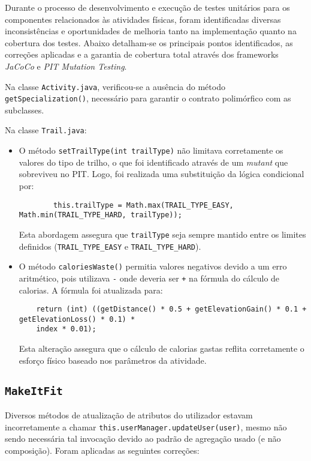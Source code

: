 \documentclass[12pt, a4paper]{article}
\begin{document}
Durante o processo de desenvolvimento e execução de testes unitários para os componentes
relacionados às atividades físicas, foram identificadas diversas inconsistências e oportunidades de
melhoria tanto na implementação quanto na cobertura dos testes. Abaixo detalham-se os principais
pontos identificados, as correções aplicadas e a garantia de cobertura total através dos frameworks
\emph{JaCoCo} e \emph{PIT Mutation Testing}.

Na classe \texttt{Activity.java}, verificou-se a ausência do método \texttt{getSpecialization()},
necessário para garantir o contrato polimórfico com as subclasses.

Na classe \texttt{Trail.java}:
\begin{itemize}
  \item O método \texttt{setTrailType(int trailType)} não limitava corretamente os valores do tipo
  de trilho, o que foi identificado através de um \emph{mutant} que sobreviveu no PIT. Logo, foi
  realizada uma substituição da lógica condicional por:
  \begin{verbatim}
        this.trailType = Math.max(TRAIL_TYPE_EASY, Math.min(TRAIL_TYPE_HARD, trailType));
  \end{verbatim}
  Esta abordagem assegura que \texttt{trailType} seja sempre mantido entre os limites definidos
  (\texttt{TRAIL_TYPE_EASY} e \texttt{TRAIL_TYPE_HARD}).

  \item O método \texttt{caloriesWaste()} permitia valores negativos devido a um erro aritmético,
  pois utilizava \texttt{-} onde deveria ser \texttt{+} na fórmula do cálculo de calorias. A fórmula
  foi atualizada para:
  \begin{verbatim}
    return (int) ((getDistance() * 0.5 + getElevationGain() * 0.1 + getElevationLoss() * 0.1) *
    index * 0.01);
  \end{verbatim}
  Esta alteração assegura que o cálculo de calorias gastas reflita corretamente o esforço físico
  baseado nos parâmetros da atividade.
\end{itemize}

\subsection{\texttt{MakeItFit}}

Diversos métodos de atualização de atributos do utilizador estavam incorretamente a chamar
\texttt{this.userManager.updateUser(user)}, mesmo não sendo necessária tal invocação devido ao
padrão de agregação usado (e não composição). Foram aplicadas as seguintes correções:
\end{document}

